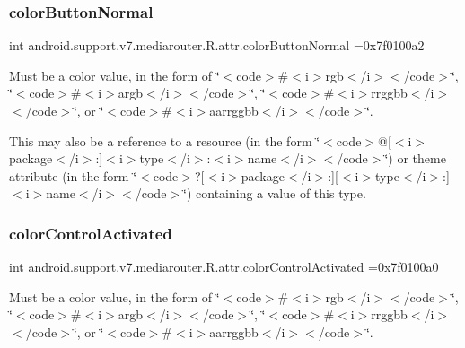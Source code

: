 \subsubsection{\texorpdfstring{color\+Button\+Normal}{colorButtonNormal}}
{\footnotesize\ttfamily int android.\+support.\+v7.\+mediarouter.\+R.\+attr.\+color\+Button\+Normal =0x7f0100a2\hspace{0.3cm}{\ttfamily [static]}}

Must be a color value, in the form of \char`\"{}$<$code$>$\#$<$i$>$rgb$<$/i$>$$<$/code$>$\char`\"{}, \char`\"{}$<$code$>$\#$<$i$>$argb$<$/i$>$$<$/code$>$\char`\"{}, \char`\"{}$<$code$>$\#$<$i$>$rrggbb$<$/i$>$$<$/code$>$\char`\"{}, or \char`\"{}$<$code$>$\#$<$i$>$aarrggbb$<$/i$>$$<$/code$>$\char`\"{}. 

This may also be a reference to a resource (in the form \char`\"{}$<$code$>$@\mbox{[}$<$i$>$package$<$/i$>$\+:\mbox{]}$<$i$>$type$<$/i$>$\+:$<$i$>$name$<$/i$>$$<$/code$>$\char`\"{}) or theme attribute (in the form \char`\"{}$<$code$>$?\mbox{[}$<$i$>$package$<$/i$>$\+:\mbox{]}\mbox{[}$<$i$>$type$<$/i$>$\+:\mbox{]}$<$i$>$name$<$/i$>$$<$/code$>$\char`\"{}) containing a value of this type. \mbox{\label{classandroid_1_1support_1_1v7_1_1mediarouter_1_1R_1_1attr_af0b9256d1a94dcf2b3984484a9028082}} 
\subsubsection{\texorpdfstring{color\+Control\+Activated}{colorControlActivated}}
{\footnotesize\ttfamily int android.\+support.\+v7.\+mediarouter.\+R.\+attr.\+color\+Control\+Activated =0x7f0100a0\hspace{0.3cm}{\ttfamily [static]}}

Must be a color value, in the form of \char`\"{}$<$code$>$\#$<$i$>$rgb$<$/i$>$$<$/code$>$\char`\"{}, \char`\"{}$<$code$>$\#$<$i$>$argb$<$/i$>$$<$/code$>$\char`\"{}, \char`\"{}$<$code$>$\#$<$i$>$rrggbb$<$/i$>$$<$/code$>$\char`\"{}, or \char`\"{}$<$code$>$\#$<$i$>$aarrggbb$<$/i$>$$<$/code$>$\char`\"{}. 

